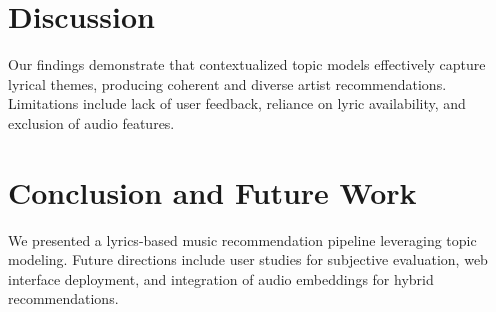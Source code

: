 \documentclass[12pt]{article}
\begin{document}
\section{Discussion}
Our findings demonstrate that contextualized topic models effectively capture
lyrical themes, producing coherent and diverse artist recommendations.
Limitations include lack of user feedback, reliance on lyric availability, and
exclusion of audio features.

\section{Conclusion and Future Work}
We presented a lyrics-based music recommendation pipeline leveraging topic
modeling. Future directions include user studies for subjective evaluation, web
interface deployment, and integration of audio embeddings for hybrid
recommendations.



\end{document}
